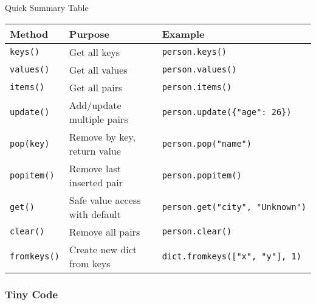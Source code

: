 \documentclass[
  letterpaper,
  DIV=11,
  numbers=noendperiod]{scrreprt}
\begin{document}
Quick Summary Table

\begin{longtable}[]{@{}
  >{\raggedright\arraybackslash}p{}
  >{\raggedright\arraybackslash}p{}
  >{\raggedright\arraybackslash}p{}@{}}
\toprule\noalign{}
\begin{minipage}[b]{\linewidth}\raggedright
Method
\end{minipage} & \begin{minipage}[b]{\linewidth}\raggedright
Purpose
\end{minipage} & \begin{minipage}[b]{\linewidth}\raggedright
Example
\end{minipage} \\
\midrule\noalign{}
\endhead
\bottomrule\noalign{}
\endlastfoot
\texttt{keys()} & Get all keys & \texttt{person.keys()} \\
\texttt{values()} & Get all values & \texttt{person.values()} \\
\texttt{items()} & Get all pairs & \texttt{person.items()} \\
\texttt{update()} & Add/update multiple pairs &
\texttt{person.update(\{"age":\ 26\})} \\
\texttt{pop(key)} & Remove by key, return value &
\texttt{person.pop("name")} \\
\texttt{popitem()} & Remove last inserted pair &
\texttt{person.popitem()} \\
\texttt{get()} & Safe value access with default &
\texttt{person.get("city",\ "Unknown")} \\
\texttt{clear()} & Remove all pairs & \texttt{person.clear()} \\
\texttt{fromkeys()} & Create new dict from keys &
\texttt{dict.fromkeys({[}"x",\ "y"{]},\ 1)} \\
\end{longtable}

\subsubsection{Tiny Code}\label{tiny-code-28}
\end{document}
